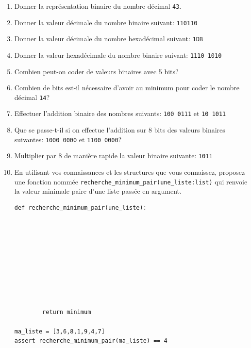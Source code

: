 \documentclass[a4paper,12pt,openany]{book}
\begin{document}
\begin{enumerate}
	\item Donner la représentation binaire du nombre décimal \verb+43+. 
	
	\vspace{3cm}
	
	\item Donner la valeur décimale du nombre binaire suivant: \verb+110110+
	
	\vspace{3cm}
	
	\item Donner la valeur décimale du nombre hexadécimal suivant: \verb+1DB+
	
	\vspace{3cm}
	
	\item Donner la valeur hexadécimale du nombre binaire suivant: \verb+1110 1010+
	
	
	\vspace{3cm}
	
	
	\item Combien peut-on coder de valeurs binaires avec 5 bits? \dotfill
	
	\bigskip
	
	\item Combien de bits est-il nécessaire d'avoir au minimum pour coder le nombre décimal \verb+14+? \dotfill
	
	
	\bigskip
	
	\item Effectuer l'addition binaire des nombres suivants: \verb+100 0111+ et \verb+10 1011+
	
	\vspace{3cm}
	
	\item Que se passe-t-il si on effectue l'addition sur 8 bits des valeurs binaires suivantes: \verb+1000 0000+ et \verb+1100 0000+?
	
	\vspace{3cm}
	
	\item Multiplier par 8 de manière rapide la valeur binaire suivante: \verb+1011+ \dotfill
	
	\vspace{3cm}
	
	
	\item En utilisant vos connaissances et les structures que vous connaissez, proposez une fonction nommée \verb+recherche_minimum_pair(une_liste:list)+ qui renvoie la valeur minimale paire d'une liste passée en argument.
	
\begin{lstlisting}[numbers=none]
def recherche_minimum_pair(une_liste):
		









		return minimum
		
ma_liste = [3,6,8,1,9,4,7]
assert recherche_minimum_pair(ma_liste) == 4
\end{lstlisting}	
\end{enumerate}
\end{document}
